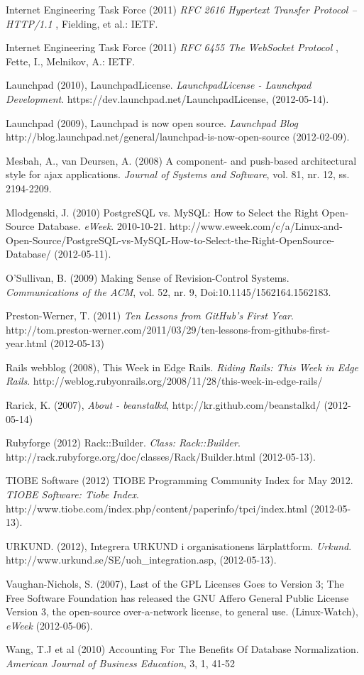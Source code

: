 \begin{flushleft}
Internet Engineering Task Force (2011) \emph{RFC 2616 Hypertext Transfer Protocol -- HTTP/1.1} , Fielding, et al.: IETF.

Internet Engineering Task Force (2011) \emph{RFC 6455 The WebSocket Protocol} , Fette, I., Melnikov, A.: IETF.

Launchpad (2010), LaunchpadLicense. \emph{LaunchpadLicense - Launchpad Development}. https://dev.launchpad.net/LaunchpadLicense, (2012-05-14).

Launchpad (2009), Launchpad is now open source. \emph{Launchpad Blog} http://blog.launchpad.net/general/launchpad-is-now-open-source (2012-02-09).

Mesbah, A., van Deursen, A. (2008) A component- and push-based architectural style for ajax applications. \emph{Journal of Systems and Software}, vol. 81, nr. 12, ss. 2194-2209.

Mlodgenski, J. (2010) PostgreSQL vs. MySQL: How to Select the Right Open-Source Database. \emph{eWeek}. 2010-10-21.  http://www.eweek.com/c/a/Linux-and-Open-Source/PostgreSQL-vs-MySQL-How-to-Select-the-Right-OpenSource-Database/ (2012-05-11).

O'Sullivan, B. (2009)  Making Sense of Revision-Control Systems. \emph{Communications of the ACM}, vol. 52, nr. 9, Doi:10.1145/1562164.1562183.

Preston-Werner, T. (2011) \emph{Ten Lessons from GitHub's First Year}. http://tom.preston-werner.com/2011/03/29/ten-lessons-from-githubs-first-year.html (2012-05-13)

Rails webblog (2008), This Week in Edge Rails. \emph{Riding Rails: This Week in Edge Rails}. http://weblog.rubyonrails.org/2008/11/28/this-week-in-edge-rails/

Rarick, K. (2007), \emph{About - beanstalkd}, http://kr.github.com/beanstalkd/ (2012-05-14)

Rubyforge (2012) Rack::Builder. \emph{Class: Rack::Builder}. http://rack.rubyforge.org/doc/classes/Rack/Builder.html (2012-05-13).

TIOBE Software (2012) TIOBE Programming Community Index for May 2012. \emph{TIOBE Software: Tiobe Index}. http://www.tiobe.com/index.php/content/paperinfo/tpci/index.html (2012-05-13).

URKUND. (2012), Integrera URKUND i organisationens lärplattform. \emph{Urkund}. http://www.urkund.se/SE/uoh\_integration.asp, (2012-05-13).

Vaughan-Nichols, S. (2007), Last of the GPL Licenses Goes to Version 3; The Free Software Foundation has released the GNU Affero General Public License Version 3, the open-source over-a-network license, to general use. (Linux-Watch), \emph{eWeek} (2012-05-06).

Wang, T.J et al (2010) Accounting For The Benefits Of Database Normalization. \emph{American Journal of Business Education}, 3, 1, 41-52
\normalsize
\end{flushleft}
